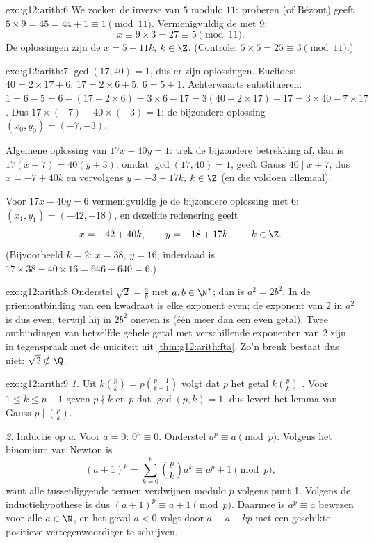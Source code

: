 \begin{solution}{exo:g12:arith:6}
We zoeken de inverse van $5$ modulo $11$: proberen (of Bézout) geeft
$5 \times 9 = 45 = 44 + 1 \equiv 1 \pmod{11}$. Vermenigvuldig de 
met $9$:
\[
x \equiv 9 \times 3 = 27 \equiv 5 \pmod{11}.
\]
De oplossingen zijn de  $x = 5 + 11k$, $k \in \Z$. (Controle:
$5\times5 = 25 \equiv 3 \pmod{11}$.)
\end{solution}

\begin{solution}{exo:g12:arith:7}
$\gcd(17, 40) = 1$, dus er zijn oplossingen. Euclides:
$40 = 2\times17 + 6$; $17 = 2\times6 + 5$; $6 = 5 + 1$. Achterwaarts
substitueren: $1 = 6 - 5 = 6 - (17 - 2\times6) = 3\times6 - 17
= 3(40 - 2\times17) - 17 = 3\times40 - 7\times17$. Dus
$17\times(-7) - 40\times(-3) = 1$: de bijzondere oplossing
$(x_0, y_0) = (-7, -3)$.

Algemene oplossing van $17x - 40y = 1$: trek de bijzondere betrekking af, dan
is $17(x + 7) = 40(y + 3)$; omdat $\gcd(17, 40) = 1$, geeft Gauss
$40 \mid x + 7$, dus $x = -7 + 40k$ en vervolgens $y = -3 + 17k$, $k \in \Z$
(en die voldoen allemaal).

Voor $17x - 40y = 6$ vermenigvuldig je de bijzondere oplossing met $6$:
$(x_1, y_1) = (-42, -18)$, en dezelfde redenering geeft
\[
x = -42 + 40k, \qquad y = -18 + 17k, \qquad k \in \Z .
\]
(Bijvoorbeeld $k = 2$: $x = 38$, $y = 16$; inderdaad is
$17\times38 - 40\times16 = 646 - 640 = 6$.)
\end{solution}

\begin{solution}{exo:g12:arith:8}
Onderstel $\sqrt2 = \frac ab$ met $a, b \in \N^*$; dan is $a^2 = 2b^2$. In de
priemontbinding van een kwadraat is elke exponent even; de exponent van $2$ in
$a^2$ is dus even, terwijl hij in $2b^2$ oneven is (één meer dan een even
getal). Twee ontbindingen van hetzelfde gehele getal met verschillende
exponenten van $2$ zijn in tegenspraak met de uniciteit uit
\cref{thm:g12:arith:fta}. Zo'n breuk bestaat dus niet: $\sqrt2 \notin \Q$.
\end{solution}

\begin{solution}{exo:g12:arith:9}
\emph{1.} Uit $k\binom pk = p \binom{p-1}{k-1}$ volgt dat $p$ het getal
$k\binom pk$ . Voor $1 \leq k \leq p-1$ geven $p \nmid k$ en $p$ 
dat $\gcd(p, k) = 1$, dus levert het lemma van Gauss $p \mid \binom pk$.

\emph{2.} Inductie op $a$. Voor $a = 0$: $0^p \equiv 0$. Onderstel
$a^p \equiv a \pmod p$. Volgens het binomium van Newton is
\[
(a+1)^p = \sum_{k=0}^{p} \binom pk a^k
\equiv a^p + 1 \pmod p,
\]
want alle tussenliggende termen verdwijnen modulo $p$ volgens punt 1. Volgens
de inductiehypothese is dus $(a+1)^p \equiv a + 1 \pmod p$. Daarmee is
$a^p \equiv a$ bewezen voor alle $a \in \N$, en het geval $a < 0$ volgt door
$a \equiv a + kp$ met een geschikte positieve vertegenwoordiger te schrijven.
\end{solution}

